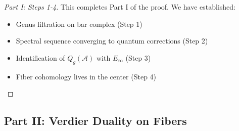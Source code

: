 \begin{proof}[Part I: Steps 1-4]
This completes Part I of the proof. We have established:
\begin{itemize}
\item Genus filtration on bar complex (Step 1)
\item Spectral sequence converging to quantum corrections (Step 2)
\item Identification of $Q_g(\mathcal{A})$ with $E_\infty$ (Step 3)
\item Fiber cohomology lives in the center (Step 4)
\end{itemize}

\end{proof}

\subsection{Part II: Verdier Duality on Fibers}

